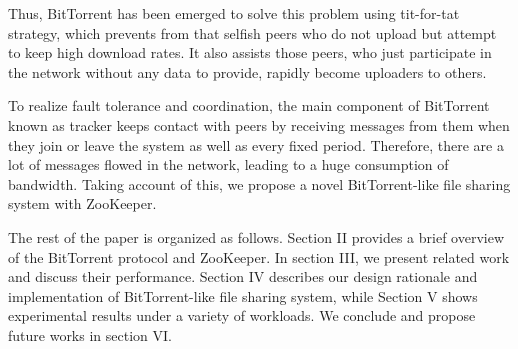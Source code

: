 \documentclass[conference]{IEEEtran}
\begin{document}
	Thus, BitTorrent has been emerged to solve this problem using tit-for-tat strategy, which prevents from that selfish peers who do not upload but attempt to keep high download rates. It also assists those peers, who just participate in the network without any data to provide, rapidly become uploaders to others.
	
	To realize fault tolerance and coordination, the main component of BitTorrent known as tracker keeps contact with peers by receiving messages from them when they join or leave the system as well as every fixed period. Therefore, there are a lot of messages flowed in the network, leading to a huge consumption of bandwidth. Taking account of this, we propose a novel BitTorrent-like file sharing system with ZooKeeper. 
	
	The rest of the paper is organized as follows. Section II provides a brief overview of the BitTorrent protocol and ZooKeeper. In section III, we present related work and discuss their performance. Section IV describes our design rationale and implementation of BitTorrent-like file sharing system, while Section V shows experimental results under a variety of workloads. We conclude and propose future works in section VI. 
	
	
	
\end{document}
